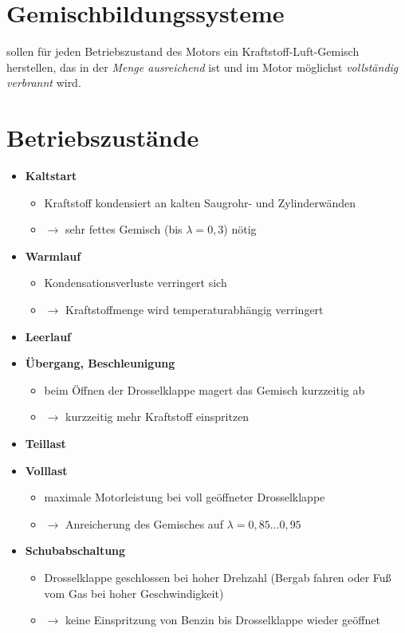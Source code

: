 \section{Gemischbildungssysteme}\label{gemischbildungssysteme}

sollen für jeden Betriebszustand des Motors ein Kraftstoff-Luft-Gemisch
herstellen, das in der \emph{Menge ausreichend} ist und im Motor
möglichst \emph{vollständig verbrannt} wird.

\section{Betriebszustände}\label{betriebszustaende}

\begin{itemize}
\item
  \textbf{Kaltstart}

  \begin{itemize}
  \item
    Kraftstoff kondensiert an kalten Saugrohr- und Zylinderwänden
  \item
    $\to$ sehr fettes Gemisch (bis $\lambda = 0,3$) nötig
  \end{itemize}
\item
  \textbf{Warmlauf}

  \begin{itemize}
  \item
    Kondensationsverluste verringert sich
  \item
    $\to$ Kraftstoffmenge wird temperaturabhängig verringert
  \end{itemize}
\item
  \textbf{Leerlauf}
\item
  \textbf{Übergang, Beschleunigung}

  \begin{itemize}
  \item
    beim Öffnen der Drosselklappe magert das Gemisch kurzzeitig ab
  \item
    $\to$ kurzzeitig mehr Kraftstoff einspritzen
  \end{itemize}
\item
  \textbf{Teillast}
\item
  \textbf{Volllast}

  \begin{itemize}
  \item
    maximale Motorleistung bei voll geöffneter Drosselklappe
  \item
    $\to$ Anreicherung des Gemisches auf $\lambda = 0,85 \dots 0,95$
  \end{itemize}
\item
  \textbf{Schubabschaltung}

  \begin{itemize}
  \item
    Drosselklappe geschlossen bei hoher Drehzahl (Bergab fahren oder Fuß
    vom Gas bei hoher Geschwindigkeit)
  \item
    $\to$ keine Einspritzung von Benzin bis Drosselklappe wieder
    geöffnet
  \end{itemize}
\end{itemize}

